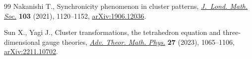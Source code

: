 \documentclass[11pt]{article}
\numberwithin{equation}{section}
\numberwithin{equation}{section}
\begin{document}
\begin{thebibliography}{99}
Nakanishi T., Synchronicity phenomenon in cluster patterns, \href{https://doi.org/10.1112/jlms.12402}{\textit{J.~Lond.
 Math. Soc.}} \textbf{103} (2021), 1120--1152, \href{https://arxiv.org/abs1906.12036}{arXiv:1906.12036}.

Sun X., Yagi J., Cluster transformations, the tetrahedron equation and
 three-dimensional gauge theories, \href{https://doi.org/10.4310/atmp.2023.v27.n4.a2}{\textit{Adv. Theor. Math. Phys.}}
 \textbf{27} (2023), 1065--1106, \href{https://arxiv.org/abs/2211.10702}{arXiv:2211.10702}.

\end{thebibliography}
\end{document}
